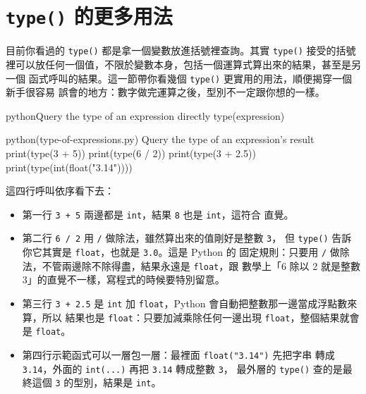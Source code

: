 \section{\texttt{type()} 的更多用法}
\label{sec:type-more-uses}

目前你看過的 \texttt{type()} 都是拿一個變數放進括號裡查詢。其實 \texttt{type()}
接受的括號裡可以放任何一個值，不限於變數本身，包括一個運算式算出來的結果，甚至是另一個
函式呼叫的結果。這一節帶你看幾個 \texttt{type()} 更實用的用法，順便揭穿一個新手很容易
誤會的地方：數字做完運算之後，型別不一定跟你想的一樣。

\begin{code}{python}{Query the type of an expression directly}
type(expression)
\end{code}

\begin{example}{python}{(type-of-expressions.py) Query the type of an expression's result}
print(type(3 + 5))
print(type(6 / 2))
print(type(3 + 2.5))
print(type(int(float("3.14"))))
\end{example}


這四行呼叫依序看下去：

\begin{itemize}
\item 第一行 \texttt{3 + 5} 兩邊都是 \texttt{int}，結果 \texttt{8} 也是 \texttt{int}，這符合
直覺。
\item 第二行 \texttt{6 / 2} 用 \texttt{/} 做除法，雖然算出來的值剛好是整數 \texttt{3}，
但 \texttt{type()} 告訴你它其實是 \texttt{float}，也就是 \texttt{3.0}。這是 Python 的
固定規則：只要用 \texttt{/} 做除法，不管兩邊除不除得盡，結果永遠是 \texttt{float}，跟
數學上「6 除以 2 就是整數 3」的直覺不一樣，寫程式的時候要特別留意。
\item 第三行 \texttt{3 +
2.5} 是 \texttt{int} 加 \texttt{float}，Python 會自動把整數那一邊當成浮點數來算，所以
結果也是 \texttt{float}：只要加減乘除任何一邊出現 \texttt{float}，整個結果就會是
\texttt{float}。
\item 第四行示範函式可以一層包一層：最裡面 \texttt{float("3.14")} 先把字串
轉成 \texttt{3.14}，外面的 \texttt{int(...)} 再把 \texttt{3.14} 轉成整數 \texttt{3}，
最外層的 \texttt{type()} 查的是最終這個 \texttt{3} 的型別，結果是 \texttt{int}。
\end{itemize}

